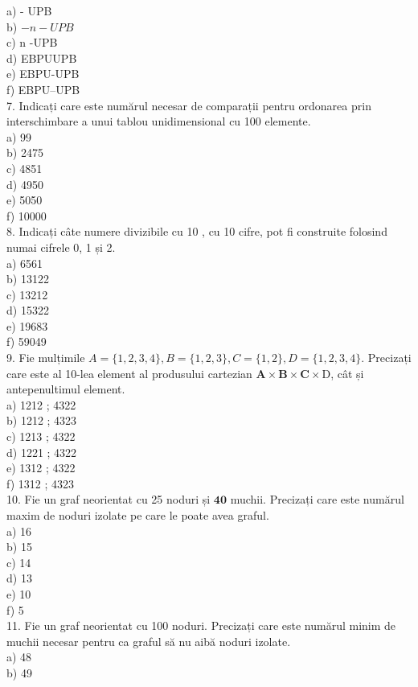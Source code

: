 \documentclass[10pt]{article}
\begin{document}
a) - UPB\\
b) $-n-U P B$\\
c) n -UPB\\
d) EBPUUPB\\
e) EBPU-UPB\\
f) EBPU--UPB\\
7. Indicați care este numărul necesar de comparații pentru ordonarea prin interschimbare a unui tablou unidimensional cu 100 elemente.\\
a) 99\\
b) 2475\\
c) 4851\\
d) 4950\\
e) 5050\\
f) 10000\\
8. Indicați câte numere divizibile cu 10 , cu 10 cifre, pot fi construite folosind numai cifrele 0, 1 și 2.\\
a) 6561\\
b) 13122\\
c) 13212\\
d) 15322\\
e) 19683\\
f) 59049\\
9. Fie mulțimile $A=\{1,2,3,4\}, B=\{1,2,3\}, C=\{1,2\}, D=\{1,2,3,4\}$. Precizați care este al 10-lea element al produsului cartezian $\mathbf{A} \times \mathbf{B} \times \mathbf{C} \times \mathrm{D}$, cât și antepenultimul element.\\
a) 1212 ; 4322\\
b) 1212 ; 4323\\
c) 1213 ; 4322\\
d) 1221 ; 4322\\
e) 1312 ; 4322\\
f) 1312 ; 4323\\
10. Fie un graf neorientat cu 25 noduri și $\mathbf{4 0}$ muchii. Precizați care este numărul maxim de noduri izolate pe care le poate avea graful.\\
a) 16\\
b) 15\\
c) 14\\
d) 13\\
e) 10\\
f) 5\\
11. Fie un graf neorientat cu 100 noduri. Precizați care este numărul minim de muchii necesar pentru ca graful să nu aibă noduri izolate.\\
a) 48\\
b) 49\\
\end{document}
